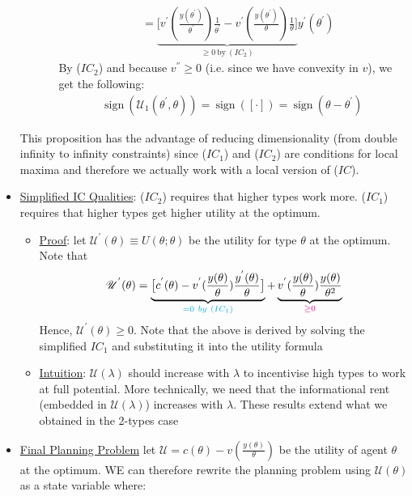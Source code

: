 \documentclass{article}
\begin{document}
\begin{itemize}
\begin{itemize}
\begin{itemize}
\begin{align*}
                &= \underbrace{\big[v^{'}(\frac{y(\theta^{'})}{\theta^{'}}) \frac{1}{\theta^{'}} - v^{'}(\frac{y(\theta^{'})}{\theta})\frac{1}{\theta} \big]}_{\geq 0 \ \text{by} \ (IC_{2})} y^{'}(\theta^{'}) \tag{$[\cdot]$}
            \end{align*}
            By ($IC_{2}$) and because $v^{''} \geq 0$ (i.e. since we have convexity in $v$), we get the following:
            \begin{gather*}
                \text{sign} \ (\mathcal{U_{1}}(\theta^{'},\theta)) = \ \text{sign} \ ([\cdot]) = \ \text{sign} \ (\theta - \theta^{'})
            \end{gather*}
        \end{itemize}
    \end{itemize}
    This proposition has the advantage of reducing dimensionality (from double infinity to infinity constraints) since ($IC_{1}$) and ($IC_{2}$) are conditions for local maxima and therefore we actually work with a local version of ($IC$).
    \item  \underline{Simplified IC Qualities}: ($IC_{2}$) requires that higher types work more. ($IC_{1}$) requires that higher types get higher utility at the optimum.
    \begin{itemize}
        \item  \underline{Proof}: let $\mathcal{U}^{'}(\theta) \equiv U(\theta; \theta)$ be the utility for type $\theta$ at the optimum. Note that
        \begin{gather*}
            \mathcal{U}^{'}(\theta) = \underbrace{\big[c^{'}(\theta) - v^{'}(\frac{y(\theta)}{\theta}) \frac{y^{'}(\theta)}{\theta}\big] }_{\begingroup\color{cyan} = 0 \ by \ (IC_{1}) \endgroup\color{cyan}} + \underbrace{ v^{'} (\frac{y(\theta)}{\theta}) \frac{y(\theta)}{\theta^{2}}}_{\begingroup\color{magenta} \geq 0 \endgroup\color{magenta}}
        \end{gather*}
        Hence, $\mathcal{U}^{'}(\theta) \geq 0$. Note that the above is derived by solving the simplified $IC_{1}$ and substituting it into the utility formula
        \item  \underline{Intuition}: $\mathcal{U}(\lambda)$ should increase with $\lambda$ to incentivise high types to work at full potential. More technically, we need that the informational rent (embedded in $\mathcal{U}(\lambda)$) increases with $\lambda$. These results extend what we obtained in the 2-types case
    \end{itemize}
    \item  \underline{Final Planning Problem} let $\mathcal{U} = c(\theta) - v(\frac{y(\theta)}{\theta})$ be the utility of agent $\theta$ at the optimum. WE can therefore rewrite the planning problem using $\mathcal{U}(\theta)$ as a state variable where:

\end{itemize}
\end{document}
